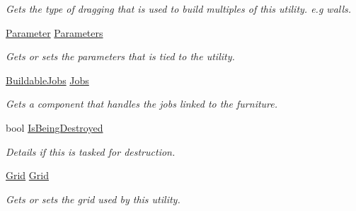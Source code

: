 \begin{DoxyCompactItemize}
\begin{DoxyCompactList}\small\item\em Gets the type of dragging that is used to build multiples of this utility. e.\+g walls. \end{DoxyCompactList}\item 
\hyperlink{class_parameter}{Parameter} \hyperlink{class_utility_a658da302287ff04bf872426e46d6eac6}{Parameters}
\begin{DoxyCompactList}\small\item\em Gets or sets the parameters that is tied to the utility. \end{DoxyCompactList}\item 
\hyperlink{class_buildable_jobs}{Buildable\+Jobs} \hyperlink{class_utility_afe0e0b52870147d9e0a84349972145c8}{Jobs}
\begin{DoxyCompactList}\small\item\em Gets a component that handles the jobs linked to the furniture. \end{DoxyCompactList}\item 
bool \hyperlink{class_utility_a4162dd92a991cc994685f53ec3f2ddb4}{Is\+Being\+Destroyed}
\begin{DoxyCompactList}\small\item\em Details if this is tasked for destruction. \end{DoxyCompactList}\item 
\hyperlink{class_project_porcupine_1_1_power_network_1_1_grid}{Grid} \hyperlink{class_utility_a291d46edb60ed6838bd5c6cd7100a8ee}{Grid}
\begin{DoxyCompactList}\small\item\em Gets or sets the grid used by this utility. \end{DoxyCompactList}\end{DoxyCompactItemize}
